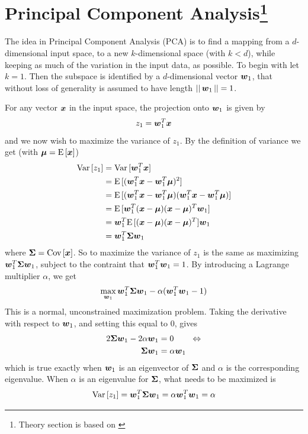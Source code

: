 \section[Principal Component Analysis]{Principal Component Analysis\protect\footnote{Theory section is based on \citet[p.113]{alpaydin10}}}
The idea in Principal Component Analysis (PCA) is to find a mapping from a $d$-dimensional input space, to a new $k$-dimensional space (with $k<d$), while keeping as much of the variation in the input data, as possible. To begin with let $k=1$. Then the subspace is identified by a $d$-dimensional vector $\boldsymbol{w}_1$, that without loss of generality is assumed to have length $||\,\boldsymbol{w}_1\,||=1$. \par
For any vector $\boldsymbol{x}$ in the input space, the projection onto $\boldsymbol{w}_1$ is given by
\[
    z_1 = \boldsymbol{w}_1^T \boldsymbol{x}
\]
and we now wish to maximize the variance of $z_1$. By the definition of variance we get (with $\boldsymbol{\mu}=\text{E}\,[\boldsymbol{x}]$)
\begin{align*}
    \text{Var}\,[z_1] &= \text{Var}\,[\boldsymbol{w}_1^T\boldsymbol{x}] \\
    &= \text{E}\,[(\boldsymbol{w}_1^T\boldsymbol{x} - \boldsymbol{w}_1^T\boldsymbol{\mu})^2] \\
    &= \text{E}\,[(\boldsymbol{w}_1^T\boldsymbol{x} - \boldsymbol{w}_1^T\boldsymbol{\mu})(\boldsymbol{w}_1^T\boldsymbol{x} - \boldsymbol{w}_1^T\boldsymbol{\mu})] \\
    &= \text{E}\,[\boldsymbol{w}_1^T(\boldsymbol{x}-\boldsymbol{\mu})(\boldsymbol{x}-\boldsymbol{\mu})^T\boldsymbol{w}_1] \\
    &= \boldsymbol{w}_1^T\text{E}\,[(\boldsymbol{x}-\boldsymbol{\mu})(\boldsymbol{x}-\boldsymbol{\mu})^T]\boldsymbol{w}_1 \\
    &= \boldsymbol{w}_1^T\boldsymbol{\Sigma}\boldsymbol{w}_1
\end{align*}
where $\boldsymbol{\Sigma} = \text{Cov}\,[\boldsymbol{x}]$. So to maximize the variance of $z_1$ is the same as maximizing $\boldsymbol{w}_1^T\boldsymbol{\Sigma}\boldsymbol{w}_1$, subject to the contraint that $\boldsymbol{w}_1^T\boldsymbol{w}_1=1$. By introducing a Lagrange multiplier $\alpha$, we get
\[
    \max_{\boldsymbol{w}_1} \boldsymbol{w}_1^T\boldsymbol{\Sigma}\boldsymbol{w}_1 - \alpha(\boldsymbol{w}_1^T\boldsymbol{w}_1 - 1)
\]
This is a normal, unconstrained maximization problem. Taking the derivative with respect to $\boldsymbol{w}_1$, and setting this equal to 0, gives
\begin{align*}
    2\boldsymbol{\Sigma}\boldsymbol{w}_1 - 2\alpha\boldsymbol{w}_1 &= 0 \quad\quad\Leftrightarrow \\
    \boldsymbol{\Sigma}\boldsymbol{w}_1 &= \alpha\boldsymbol{w}_1
\end{align*}
which is true exactly when $\boldsymbol{w}_1$ is an eigenvector of $\boldsymbol{\Sigma}$ and $\alpha$ is the corresponding eigenvalue. When $\alpha$ is an eigenvalue for $\boldsymbol{\Sigma}$, what needs to be maximized is
\[
    \text{Var}\,[z_1] = \boldsymbol{w}_1^T\boldsymbol{\Sigma}\boldsymbol{w}_1 = \alpha\boldsymbol{w}_1^T\boldsymbol{w}_1 = \alpha
\]

